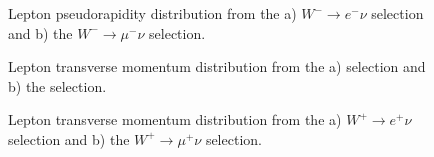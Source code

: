 \begin{figure}[h]
\begin{minipage}[h]{0.49\linewidth}
\end{minipage}
\hfill
\begin{minipage}[h]{0.49\linewidth}
\end{minipage}
\label{ris:WlnuMLep}
\caption{Lepton pseudorapidity distribution from the a) $W^{-} \to e^{-} \nu$ selection and  b) the $W^{-} \to \mu^{-} \nu$ selection.}
\end{figure}


\begin{figure}[h]
\begin{minipage}[h]{0.49\linewidth}
\end{minipage}
\hfill
\begin{minipage}[h]{0.49\linewidth}
\end{minipage}
\label{ris:WlnuLepPt}
\caption{Lepton transverse momentum distribution from the a) \wenu selection and  b) the \wmunu selection.}
\end{figure}

\begin{figure}[h]
\begin{minipage}[h]{0.49\linewidth}
\end{minipage}
\hfill
\begin{minipage}[h]{0.49\linewidth}
\end{minipage}
\label{ris:WlnuPLepPt}
\caption{Lepton transverse momentum distribution from the a) $W^{+} \to e^{+} \nu$ selection and  b) the $W^{+} \to \mu^{+} \nu$ selection.}
\end{figure}

